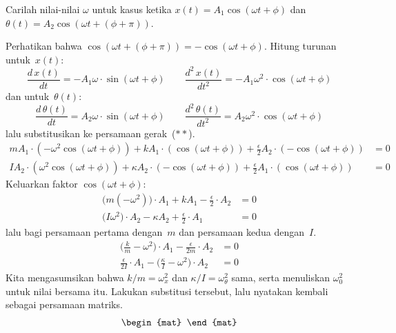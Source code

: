 \begin{exercises}
\item Carilah nilai-nilai $\omega$ untuk kasus ketika 
  $x(t)=A_1\cos(\omega t+\phi)$
  dan $\theta(t)=A_2\cos(\omega t+(\phi+\pi))$.
  \begin{answer}
    Perhatikan bahwa $\cos(\omega t+(\phi+\pi))=-\cos(\omega t+\phi)$.
    Hitung turunan untuk~$x(t)$: 
    \begin{equation*}
      \frac{d\,x(t)}{dt}=-A_1\omega\cdot\sin(\omega t+\phi)
      \qquad
      \frac{d^2\,x(t)}{dt^2}=-A_1\omega^2\cdot\cos(\omega t+\phi)
    \end{equation*}
    dan untuk~$\theta(t)$: 
    \begin{equation*}
      \frac{d\,\theta(t)}{dt}=A_2\omega\cdot\sin(\omega t+\phi)
      \qquad
      \frac{d^2\,\theta(t)}{dt^2}=A_2\omega^2\cdot\cos(\omega t+\phi)
    \end{equation*}
    lalu substitusikan ke persamaan gerak~($**$).
    \begin{align*}
      mA_1\cdot(-\omega^2\cos(\omega t+\phi))
          +kA_1\cdot (\cos(\omega t+\phi))
          +\frac{\epsilon}{2}A_2\cdot (-\cos(\omega t+\phi)) 
          &=0  \\
      IA_2\cdot(\omega^2\cos(\omega t+\phi))
          +\kappa A_2\cdot (-\cos(\omega t+\phi))
          +\frac{\epsilon}{2}A_1\cdot (\cos(\omega t+\phi))  
          &=0  
    \end{align*}
    Keluarkan faktor $\cos(\omega t+\phi)$: 
    \begin{align*}
     \big(m(-\omega^2)\big)\cdot A_1
         +kA_1 
         -\frac{\epsilon}{2}\cdot A_2 
         &=0  \\
     \big(I\omega^2\big)\cdot A_2
         -\kappa A_2
         +\frac{\epsilon}{2}\cdot A_1  
         &=0  
   \end{align*}
    lalu bagi persamaan pertama dengan~$m$ dan persamaan kedua dengan~$I$.
    \begin{align*}
     \big(\frac{k}{m}-\omega^2\big)\cdot A_1 
         -\frac{\epsilon}{2m}\cdot A_2 
         &=0  \\
     \frac{\epsilon}{2I}\cdot A_1  
     -\big(\frac{\kappa}{I}-\omega^2\big)\cdot A_2
         &=0  
   \end{align*}
   Kita mengasumsikan bahwa $k/m=\omega_{x}^2$ dan
   $\kappa/I=\omega_{\theta}^2$ sama, serta menuliskan $\omega_0^2$
   untuk nilai bersama itu.
   Lakukan substitusi tersebut, lalu nyatakan kembali sebagai persamaan matriks.
   \begin{equation*}
     \begin{mat}

\end{mat}
\end{equation*}
\end{answer}
\end{exercises}
